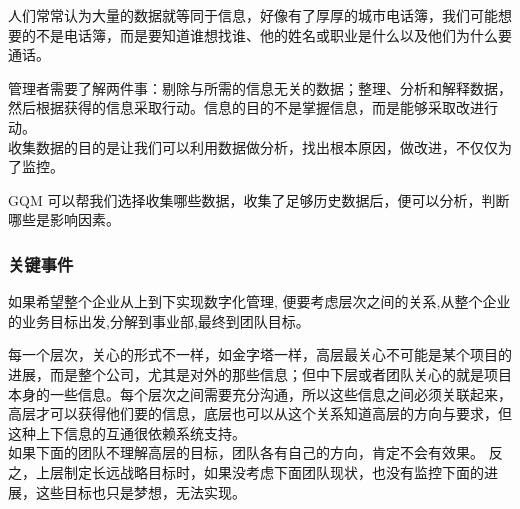 
人们常常认为大量的数据就等同于信息，好像有了厚厚的城市电话簿，我们可能想要的不是电话簿，而是要知道谁想找谁、他的姓名或职业是什么以及他们为什么要通话。

管理者需要了解两件事：剔除与所需的信息无关的数据；整理、分析和解释数据，然后根据获得的信息采取行动。信息的目的不是掌握信息，而是能够采取改进行动。\\
收集数据的目的是让我们可以利用数据做分析，找出根本原因，做改进，不仅仅为了监控。\\


GQM
可以帮我们选择收集哪些数据，收集了足够历史数据后，便可以分析，判断哪些是影响因素。\\

\hypertarget{ux5173ux952eux4e8bux4ef6}{%
\subsubsection{关键事件}\label{ux5173ux952eux4e8bux4ef6}}

如果希望整个企业从上到下实现数字化管理,
便要考虑层次之间的关系,从整个企业的业务目标出发,分解到事业部,最终到团队目标。

每一个层次，关心的形式不一样，如金字塔一样，高层最关心不可能是某个项目的进展，而是整个公司，尤其是对外的那些信息；但中下层或者团队关心的就是项目本身的一些信息。每个层次之间需要充分沟通，所以这些信息之间必须关联起来，高层才可以获得他们要的信息，底层也可以从这个关系知道高层的方向与要求，但这种上下信息的互通很依赖系统支持。\\
如果下面的团队不理解高层的目标，团队各有自己的方向，肯定不会有效果。
反之，上层制定长远战略目标时，如果没考虑下面团队现状，也没有监控下面的进展，这些目标也只是梦想，无法实现。


